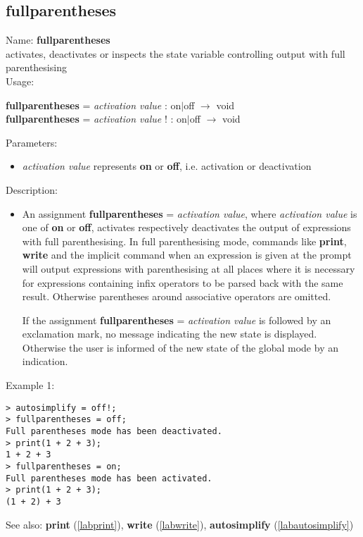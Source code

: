 \subsection{fullparentheses}
\label{labfullparentheses}
\noindent Name: \textbf{fullparentheses}\\
activates, deactivates or inspects the state variable controlling output with full parenthesising\\
\noindent Usage: 
\begin{center}
\textbf{fullparentheses} = \emph{activation value} : \textsf{on$|$off} $\rightarrow$ \textsf{void}
\\ 
\textbf{fullparentheses} = \emph{activation value} ! : \textsf{on$|$off} $\rightarrow$ \textsf{void}
\\ 
\end{center}
Parameters: 
\begin{itemize}
\item \emph{activation value} represents \textbf{on} or \textbf{off}, i.e. activation or deactivation
\end{itemize}
\noindent Description: \begin{itemize}

\item An assignment \textbf{fullparentheses} = \emph{activation value}, where \emph{activation value}
   is one of \textbf{on} or \textbf{off}, activates respectively deactivates the output
   of expressions with full parenthesising. In full parenthesising mode,
   \sollya commands like \textbf{print}, \textbf{write} and the implicit command when an
   expression is given at the prompt will output expressions with
   parenthesising at all places where it is necessary for expressions
   containing infix operators to be parsed back with the same
   result. Otherwise parentheses around associative operators are
   omitted.
    
   If the assignment \textbf{fullparentheses} = \emph{activation value} is followed by an
   exclamation mark, no message indicating the new state is
   displayed. Otherwise the user is informed of the new state of the
   global mode by an indication.
\end{itemize}
\noindent Example 1: 
\begin{center}\begin{minipage}{15cm}\begin{Verbatim}[frame=single]
> autosimplify = off!;
> fullparentheses = off;
Full parentheses mode has been deactivated.
> print(1 + 2 + 3);
1 + 2 + 3
> fullparentheses = on;
Full parentheses mode has been activated.
> print(1 + 2 + 3);
(1 + 2) + 3
\end{Verbatim}
\end{minipage}\end{center}
See also: \textbf{print} (\ref{labprint}), \textbf{write} (\ref{labwrite}), \textbf{autosimplify} (\ref{labautosimplify})
